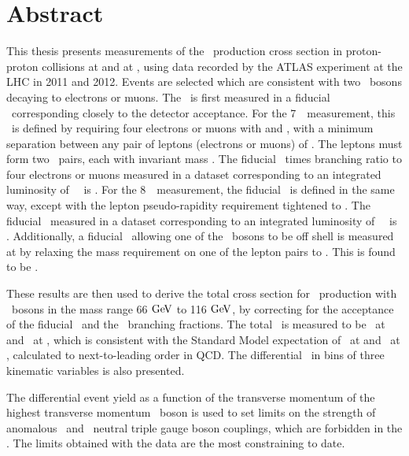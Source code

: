 \chapter*{Abstract}
This thesis presents measurements of the \ZZ\ production cross section in
proton-proton collisions at  and at , using data recorded
by the ATLAS experiment at the LHC in 2011 and 2012.  Events are selected which
are consistent with two \Z\ bosons decaying to electrons or muons. The \cx\ is
first measured in a fiducial \phasespace\ corresponding closely to the detector
acceptance. For the 7~\tev\ measurement, this \phasespace\ is defined by requiring four
electrons or muons with  and , with a minimum separation
between any pair of leptons (electrons or muons) of . The leptons
must form two \ossf\ pairs, each with invariant mass \sstooos. The fiducial \cx\
times branching ratio to four electrons or muons
measured in a dataset corresponding to an integrated luminosity of
\LumiPassGRLTwentyEleven~\ifb\ is \ZZSevenTeVFiducialCrossSectionZZLLLL. For the
8~\tev\ measurement, the fiducial \phasespace\ is defined in the same way, except with
the lepton pseudo-rapidity requirement tightened to \modetalt{2.7}. The fiducial \cx\
measured in a dataset corresponding to an integrated luminosity of
\LumiPassGRLTwentyTwelve~\ifb\ is \ZZEightTeVFiducialCrossSectionZZLLLL.
Additionally, a fiducial \cx\ allowing one of the \Z\ bosons to be off shell is
measured at \sqrtseq{7} by relaxing the mass requirement on one of the lepton pairs
to \mllgtt. This is found to be \ZZSevenTeVFiducialCrossSectionZZsLLLL.

These results are then used to derive the total cross section for \ZZ\
production with \Z\ bosons in the mass range 66$\GeV$ to 116$\GeV$, by
correcting for the acceptance of the fiducial \phasespace\ and the \Zll\
branching fractions. The total \cx\ is measured to be
\ZZSevenTeVTotalCrossSection\ at \sqrtseq{7} and \ZZEightTeVTotalCrossSection\
at , which is consistent with the Standard Model expectation of
\ZZSevenTeVTheoryTotalCrossSection\ at \sqrtseq{7} and
\ZZEightTeVTheoryTotalCrossSection\ at \sqrtseq{8}, calculated to
next-to-leading order in QCD.  The differential \cx\ in bins of three kinematic
variables is also presented.

The differential event yield as a function of the transverse momentum of the
highest transverse momentum \Z\ boson is used to set limits on the strength of
anomalous \ZZZ\ and \ZZg\ neutral triple gauge boson couplings, which are
forbidden in the \sm. 
The limits obtained with the \sqrtseq{8} data are the most constraining to date.
